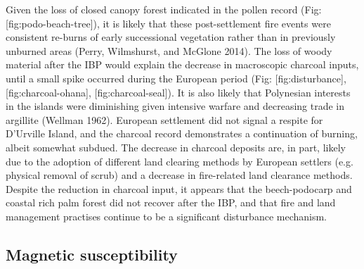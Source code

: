 Given the loss of closed canopy forest indicated in the pollen record
(Fig: {[}fig:podo-beach-tree{]}), it is likely that these
post-settlement fire events were consistent re-burns of early
successional vegetation rather than in previously unburned areas (Perry,
Wilmshurst, and McGlone 2014). The loss of woody material after the IBP
would explain the decrease in macroscopic charcoal inputs, until a small
spike occurred during the European period (Fig: {[}fig:disturbance{]},
{[}fig:charcoal-ohana{]}, {[}fig:charcoal-seal{]}). It is also likely
that Polynesian interests in the islands were diminishing given
intensive warfare and decreasing trade in argillite (Wellman 1962).
European settlement did not signal a respite for D'Urville Island, and
the charcoal record demonstrates a continuation of burning, albeit
somewhat subdued. The decrease in charcoal deposits are, in part, likely
due to the adoption of different land clearing methods by European
settlers (e.g. physical removal of scrub) and a decrease in fire-related
land clearance methods. Despite the reduction in charcoal input, it
appears that the beech-podocarp and coastal rich palm forest did not
recover after the IBP, and that fire and land management practises
continue to be a significant disturbance mechanism.

\subsection{Magnetic susceptibility}\label{magnetic-susceptibility-2}

